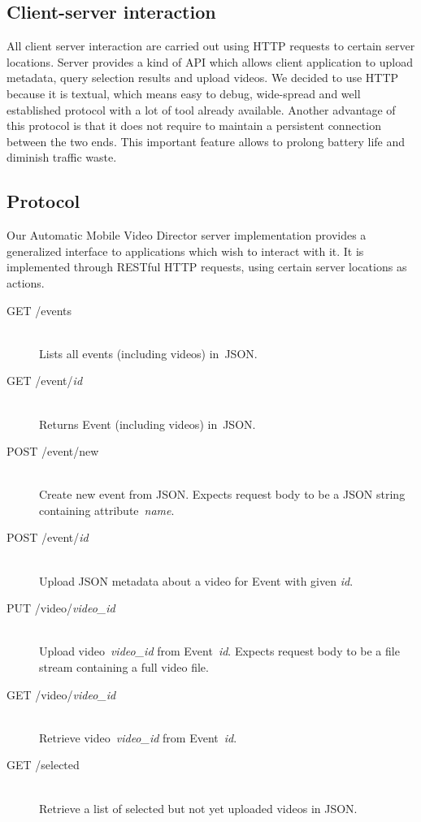 \documentclass[conference]{IEEEtran}
\begin{document}
\subsection{Client-server interaction}

All client server interaction are carried out using HTTP requests to certain server locations.
Server provides a kind of API which allows client application to upload metadata, query selection results and upload videos.
We decided to use HTTP because it is textual, which means easy to debug, 
wide-spread and well established protocol with a lot of tool already available. 
Another advantage of this protocol is that it does not require to maintain a persistent connection between the two ends.
This important feature allows to prolong battery life and diminish traffic waste.

\subsection{Protocol}

Our Automatic Mobile Video Director server implementation provides 
a generalized interface to applications which wish to interact with it. 
It is implemented through RESTful HTTP requests, using certain server locations as actions.

\begin{description}
	\item[GET /events]\hfill\\
		Lists all events (including videos) in~JSON.
		
	\item[GET /event/\textit{id}]\hfill\\
		Returns Event (including videos) in~JSON.
				
	\item[POST /event/new]\hfill\\
		Create new event from JSON.
		Expects request body to be a JSON string containing attribute~\textit{name}.
		
	\item[POST /event/\textit{id}]\hfill\\
		Upload JSON metadata about a video for Event with given \textit{id}.
		
	\item[PUT /video/\textit{video\_id}]\hfill\\
		Upload video~\textit{video\_id} from Event~\textit{id}.
		Expects request body to be a file stream containing a full video file.
		
	\item[GET /video/\textit{video\_id}]\hfill\\
		Retrieve video~\textit{video\_id} from Event~\textit{id}.
		
	\item[GET /selected]\hfill\\
		Retrieve a list of selected but not yet uploaded videos in JSON.	
		
\end{description}
\end{document}
